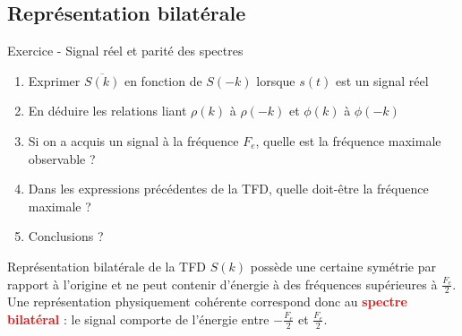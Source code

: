 \documentclass{beamer}
\newcounter{exampleBlockCounter}
\begin{document}
\subsection{Représentation bilatérale}
\begin{frame}
\begin{exampleblock}{Exercice  - Signal réel et parité des spectres}
\begin{enumerate}\justifying
	\item Exprimer $\overline{S(k)}$ en fonction de $S(-k)$ lorsque $s(t)$ est un
	signal réel
	\item En déduire les relations liant $\rho(k)$ à $\rho(-k)$ et $\phi(k)$ à
	$\phi(-k)$
	\item Si on a acquis un signal à la fréquence $F_e$, quelle est la fréquence
	maximale observable ?
	\item Dans les expressions précédentes de la TFD, quelle doit-être la
	fréquence maximale ?
	\item Conclusions ?
\end{enumerate}
\end{exampleblock}
\pause
\begin{alertblock}{Représentation bilatérale de la TFD}
\justifying
$S(k)$ possède une certaine symétrie par rapport à l'origine et ne peut contenir
d'énergie à des fréquences supérieures à $\frac{F_e}{2}$. Une 
représentation physiquement cohérente correspond donc
au \textcolor{red}{\textbf{spectre bilatéral}} : le signal comporte de
l'énergie entre $-\frac{F_e}{2}$ et $\frac{F_e}{2}$.
\end{alertblock}
\end{frame}
\end{document}

